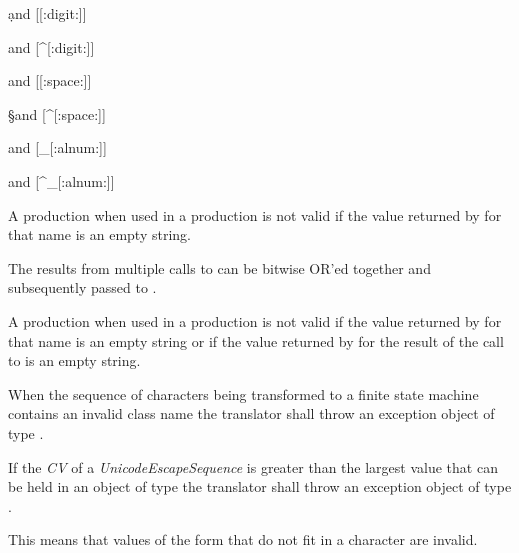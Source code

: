 \begin{codeblock}
\d and [[:digit:]]

\D and [^[:digit:]]

\s and [[:space:]]

\S and [^[:space:]]

\w and [_[:alnum:]]

\W and [^_[:alnum:]]
\end{codeblock}

\pnum
{}%
%
A  production when used in
a  production is not valid 
if the value returned by  for
that name is an empty string. 

\pnum
{}%
%
%
%
The results from multiple calls
to  can be bitwise OR'ed 
together and subsequently passed to .

\pnum
{}%
%
A  production when used in
a  production is not valid if the value
returned by  for that name is an
empty string or if the value returned by  
for the result of the call to 
is an empty string. 

\pnum
{}%
When the sequence of characters being transformed to a finite state
machine contains an invalid class name the translator shall throw an
exception object of type . 

\pnum
{}%
If the \textit{CV} of a \textit{UnicodeEscapeSequence} is greater than the largest
value that can be held in an object of type  the translator shall
throw an exception object of type . \begin{note}
This means that values of the form  that do not fit in
a character are invalid.  \end{note}


